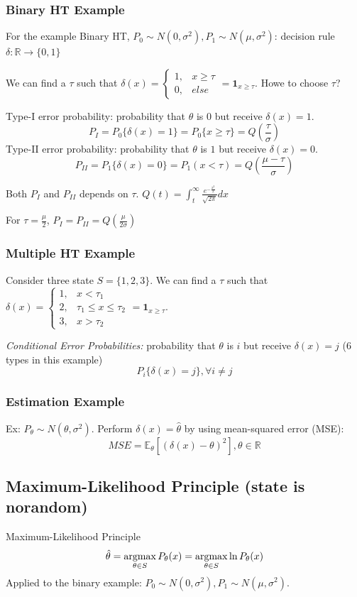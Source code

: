 \documentclass[11pt,a4paper]{article}
\newcommand{\argmax}{\operatornamewithlimits{argmax}}
\begin{document}
\subsubsection*{Binary HT Example}
For the example Binary HT, $P_0\sim N(0,\sigma^2), P_1\sim N(\mu,\sigma^2)$: decision rule $\delta: \mathbb{R} \rightarrow \{0,1\}$

We can find a $\tau$ such that $\delta(x)=\left\{\begin{matrix}
    1,&x\ge \tau\\
    0,& else
\end{matrix}\right.=\mathbf{1}_{x\geq \tau}$. Howe to choose $\tau$?

Type-I error probability: probability that $\theta$ is $0$ but receive $\delta(x)=1$. $$P_I=P_0\{\delta(x)=1\}=P_0\{x\geq \tau\}=Q\left(\frac{\tau}{\sigma}\right)$$
Type-II error probability: probability that $\theta$ is $1$ but receive $\delta(x)=0$. $$P_{II}=P_1\{\delta(x)=0\}=P_1(x<\tau)=Q(\frac{\mu-\tau}{\sigma})$$

Both $P_I$ and $P_{II}$ depends on $\tau$. $Q(t)=\int_t^\infty\frac{e^{-\frac{x^2}{2}}}{\sqrt{2\pi}}dx$

For $\tau=\frac{\mu}{2}$, $P_I=P_{II}=Q\left(\frac{\mu}{2\sigma}\right)$

\subsubsection*{Multiple HT Example}
Consider three state $S=\{1,2,3\}$.
We can find a $\tau$ such that $\delta(x)=\left\{\begin{matrix}
    1,&x< \tau_1\\
    2,& \tau_1\leq x\leq \tau_2\\
    3,& x>\tau_2
\end{matrix}\right.=\mathbf{1}_{x\geq \tau}$.

\textit{Conditional Error Probabilities:} probability that $\theta$ is $i$ but receive $\delta(x)=j$ (6 types in this example) $$P_i\{\delta(x)=j\}, \forall i\neq j$$

\subsubsection*{Estimation Example}
Ex: $P_\theta\sim N(\theta,\sigma^2)$. Perform $\delta(x)=\hat{\theta}$ by using mean-squared error (MSE):
$$MSE= \mathbb{E}_\theta \left[(\delta(x)-\theta)^2\right],\theta\in \mathbb{R}$$

\subsection{Maximum-Likelihood Principle (state is norandom)}
Maximum-Likelihood Principle $$\hat{\theta}=\argmax_{\theta\in S}P_{\theta}(x)=\argmax_{\theta\in S}\ln P_{\theta}(x)$$
Applied to the binary example: $P_0\sim N(0,\sigma^2), P_1\sim N(\mu,\sigma^2)$.
\end{document}

